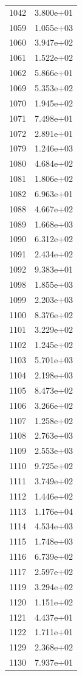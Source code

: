 \documentclass[12pt]{article}
\begin{document}
\begin{longtable}{@{}cc@{}}
1042 & 3.800e+01 \\
1059 & 1.055e+03 \\
1060 & 3.947e+02 \\
1061 & 1.522e+02 \\
1062 & 5.866e+01 \\
1069 & 5.353e+02 \\
1070 & 1.945e+02 \\
1071 & 7.498e+01 \\
1072 & 2.891e+01 \\
1079 & 1.246e+03 \\
1080 & 4.684e+02 \\
1081 & 1.806e+02 \\
1082 & 6.963e+01 \\
1088 & 4.667e+02 \\
1089 & 1.668e+03 \\
1090 & 6.312e+02 \\
1091 & 2.434e+02 \\
1092 & 9.383e+01 \\
1098 & 1.855e+03 \\
1099 & 2.203e+03 \\
1100 & 8.376e+02 \\
1101 & 3.229e+02 \\
1102 & 1.245e+02 \\
1103 & 5.701e+03 \\
1104 & 2.198e+03 \\
1105 & 8.473e+02 \\
1106 & 3.266e+02 \\
1107 & 1.258e+02 \\
1108 & 2.763e+03 \\
1109 & 2.553e+03 \\
1110 & 9.725e+02 \\
1111 & 3.749e+02 \\
1112 & 1.446e+02 \\
1113 & 1.176e+04 \\
1114 & 4.534e+03 \\
1115 & 1.748e+03 \\
1116 & 6.739e+02 \\
1117 & 2.597e+02 \\
1119 & 3.294e+02 \\
1120 & 1.151e+02 \\
1121 & 4.437e+01 \\
1122 & 1.711e+01 \\
1129 & 2.368e+02 \\
1130 & 7.937e+01 \\

\end{longtable}
\end{document}
